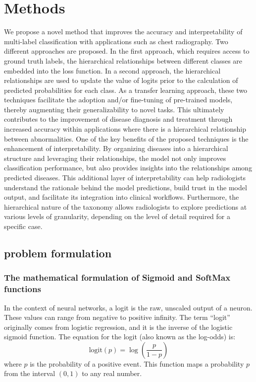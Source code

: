 \section{Methods}\label{sec:taxonomy.methods}
We propose a novel method that improves the accuracy and interpretability of multi-label classification with applications such as chest radiography. Two different approaches are proposed.  In the first approach, which requires access to ground truth labels, the hierarchical relationships between different classes are embedded into the loss function. In a second approach, the hierarchical relationships are used to update the value of logits prior to the calculation of predicted probabilities for each class.  As a transfer learning approach, these two techniques facilitate the adoption and/or fine-tuning of pre-trained models, thereby augmenting their generalizability to novel tasks. This ultimately contributes to the improvement of disease diagnosis and treatment through increased accuracy within applications where there is a hierarchical relationship between abnormalities.
One of the key benefits of the proposed techniques is the enhancement of interpretability. By organizing diseases into a hierarchical structure and leveraging their relationships, the model not only improves classification performance, but also provides insights into the relationships among predicted diseases. This additional layer of interpretability can help radiologists understand the rationale behind the model predictions, build trust in the model output, and facilitate its integration into clinical workflows. Furthermore, the hierarchical nature of the taxonomy allows radiologists to explore predictions at various levels of granularity, depending on the level of detail required for a specific case.
\subsection{problem formulation}\label{subsec:taxonomy.problem_formulation}
%
\subsubsection{The mathematical formulation of Sigmoid and SoftMax functions~\cite{furnieles_Sigmoid_2022}}
In the context of neural networks, a logit is the raw, unscaled output of a neuron. These values can range from negative to positive infinity. The term ``logit'' originally comes from logistic regression, and it is the inverse of the logistic sigmoid function. The equation for the logit (also known as the log-odds) is:
\begin{equation}
\text{{logit}}(p) = \log \left( \frac{p}{1 - p} \right)
\end{equation}
where \( p \) is the probability of a positive event. This function maps a probability \( p \) from the interval \((0,1)\) to any real number.


